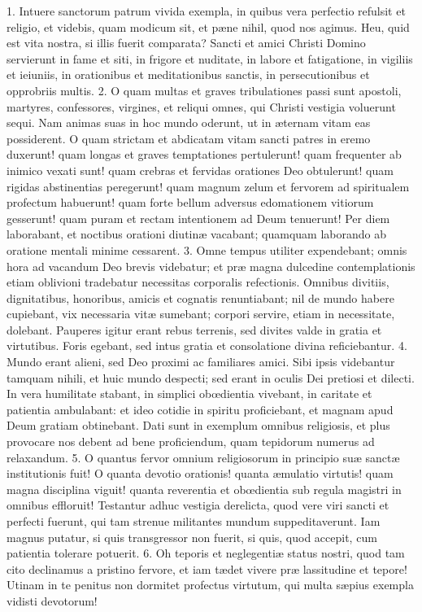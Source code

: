 1. Intuere sanctorum patrum vivida exempla, in quibus vera perfectio refulsit et religio, et videbis, quam modicum sit, et pæne nihil, quod nos agimus. Heu, quid est vita nostra, si illis fuerit comparata? Sancti et amici Christi Domino servierunt in fame et siti, in frigore et nuditate, in labore et fatigatione, in vigiliis et ieiuniis, in orationibus et meditationibus sanctis, in persecutionibus et opprobriis multis.
2. O quam multas et graves tribulationes passi sunt apostoli, martyres, confessores, virgines, et reliqui omnes, qui Christi vestigia voluerunt sequi. Nam animas suas in hoc mundo oderunt, ut in æternam vitam eas possiderent. O quam strictam et abdicatam vitam sancti patres in eremo duxerunt! quam longas et graves temptationes pertulerunt! quam frequenter ab inimico vexati sunt! quam crebras et fervidas orationes Deo obtulerunt! quam rigidas abstinentias peregerunt! quam magnum zelum et fervorem ad spiritualem profectum habuerunt! quam forte bellum adversus edomationem vitiorum gesserunt! quam puram et rectam intentionem ad Deum tenuerunt! Per diem laborabant, et noctibus orationi diutinæ vacabant; quamquam laborando ab oratione mentali minime cessarent.
3. Omne tempus utiliter expendebant; omnis hora ad vacandum Deo brevis videbatur; et præ magna dulcedine contemplationis etiam oblivioni tradebatur necessitas corporalis refectionis. Omnibus divitiis, dignitatibus, honoribus, amicis et cognatis renuntiabant; nil de mundo habere cupiebant, vix necessaria vitæ sumebant; corpori servire, etiam in necessitate, dolebant. Pauperes igitur erant rebus terrenis, sed divites valde in gratia et virtutibus. Foris egebant, sed intus gratia et consolatione divina reficiebantur.
4. Mundo erant alieni, sed Deo proximi ac familiares amici. Sibi ipsis videbantur tamquam nihili, et huic mundo despecti; sed erant in oculis Dei pretiosi et dilecti. In vera humilitate stabant, in simplici obœdientia vivebant, in caritate et patientia ambulabant: et ideo cotidie in spiritu proficiebant, et magnam apud Deum gratiam obtinebant. Dati sunt in exemplum omnibus religiosis, et plus provocare nos debent ad bene proficiendum, quam tepidorum numerus ad relaxandum.
5. O quantus fervor omnium religiosorum in principio suæ sanctæ institutionis fuit! O quanta devotio orationis! quanta æmulatio virtutis! quam magna disciplina viguit! quanta reverentia et obœdientia sub regula magistri in omnibus effloruit! Testantur adhuc vestigia derelicta, quod vere viri sancti et perfecti fuerunt, qui tam strenue militantes mundum suppeditaverunt. Iam magnus putatur, si quis transgressor non fuerit, si quis, quod accepit, cum patientia tolerare potuerit.
6. Oh teporis et neglegentiæ status nostri, quod tam cito declinamus a pristino fervore, et iam tædet vivere præ lassitudine et tepore! Utinam in te penitus non dormitet profectus virtutum, qui multa sæpius exempla vidisti devotorum!


